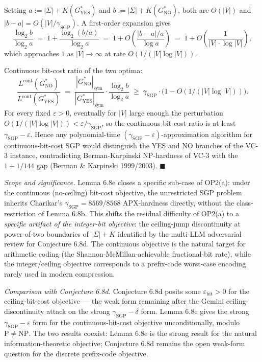 \documentclass[
]{article}
\begin{document}
Setting $a := |\Sigma| + K(G^*_{\mathrm{YES}})$ and
$b := |\Sigma| + K(G^*_{\mathrm{NO}})$, both are $\Theta(|V|)$ and
$|b - a| = O(|V|/\gamma_{\mathrm{SGP}})$. A first-order expansion gives
\[
\frac{\log_2 b}{\log_2 a} \;=\; 1 + \frac{\log_2(b/a)}{\log_2 a} \;=\; 1 + O\!\left(\frac{|b-a|/a}{\log a}\right) \;=\; 1 + O\!\left(\frac{1}{|V| \cdot \log |V|}\right),
\]
which approaches $1$ as $|V| \to \infty$ at rate $O(1/(|V| \log |V|))$.

Continuous bit-cost ratio of the two optima:
\[
\frac{L^{\mathrm{cont}}(G^*_{\mathrm{NO}})}{L^{\mathrm{cont}}(G^*_{\mathrm{YES}})}
\;=\; \frac{|G^*_{\mathrm{NO}}|_{\mathrm{sym}}}{|G^*_{\mathrm{YES}}|_{\mathrm{sym}}} \cdot \frac{\log_2 b}{\log_2 a}
\;\geq\; \gamma_{\mathrm{SGP}} \cdot \bigl(1 - O(1/(|V| \log |V|))\bigr).
\]
For every fixed $\varepsilon > 0$, eventually for $|V|$ large enough
the perturbation $O(1/(|V| \log |V|)) < \varepsilon / \gamma_{\mathrm{SGP}}$,
so the continuous-bit-cost ratio is at least
$\gamma_{\mathrm{SGP}} - \varepsilon$. Hence any polynomial-time
$(\gamma_{\mathrm{SGP}} - \varepsilon)$-approximation algorithm for
continuous-bit-cost SGP would distinguish the YES and NO branches of
the VC-3 instance, contradicting Berman-Karpinski NP-hardness of VC-3
with the $1 + 1/144$ gap (Berman \& Karpinski 1999/2003).
\hfill$\blacksquare$

\emph{Scope and significance.} Lemma 6.8e closes a specific sub-case
of OP2(a): under the continuous (no-ceiling) bit-cost objective, the
unrestricted SGP problem inherits Charikar's $\gamma_{\mathrm{SGP}} =
8569/8568$ APX-hardness directly, without the class-restriction of
Lemma 6.8b. This shifts the residual difficulty of OP2(a) to a
\emph{specific artifact of the integer-bit objective}: the
ceiling-jump discontinuity at power-of-two boundaries of $|\Sigma| + K$
identified by the multi-LLM adversarial review for Conjecture 6.8d.
The continuous objective is the natural target for arithmetic coding
(the Shannon-McMillan-achievable fractional-bit rate), while the
integer/ceiling objective corresponds to a prefix-code worst-case
encoding rarely used in modern compression.

\emph{Comparison with Conjecture 6.8d.} Conjecture 6.8d posits some
$\varepsilon_{\mathrm{bit}} > 0$ for the ceiling-bit-cost objective ---
the weak form remaining after the Gemini ceiling-discontinuity attack
on the strong $\gamma_{\mathrm{SGP}} - \delta$ form. Lemma 6.8e gives
the strong $\gamma_{\mathrm{SGP}} - \varepsilon$ form for the
continuous-bit-cost objective unconditionally, modulo $\mathrm{P} \neq
\mathrm{NP}$. The two results coexist: Lemma 6.8e is the strong result
for the natural information-theoretic objective; Conjecture 6.8d
remains the open weak-form question for the discrete prefix-code
objective.
\end{document}
